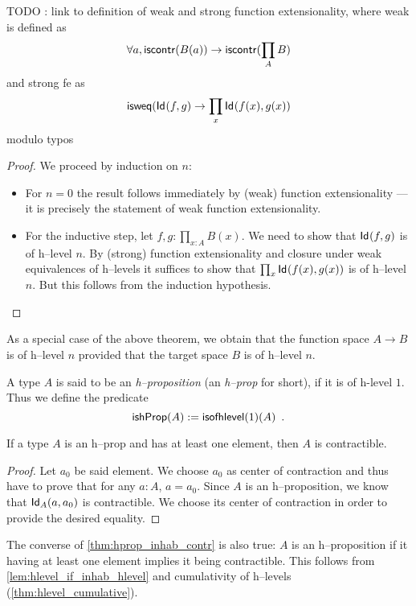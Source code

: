 TODO : link to definition of weak and strong function extensionality, where
weak is defined as
\[ \forall a, \iscontr (B(a)) \to \iscontr (\prod_A B) \]
and strong fe as
\[ \isweq (\idtype{f}{g} \to \prod_x \idtype{f(x)}{g(x)} \]
modulo typos

\begin{proof}
 We proceed by induction on $n$:
 \begin{itemize}
  \item For $n = 0$ the result follows immediately by (weak) function extensionality ---
        it is precisely the statement of weak function extensionality.
  \item For the inductive step, let $f, g : \prod_{x:A}B(x)$. We need to show that
      $\idtype{f}{g}$ is of h--level $n$. By (strong) function extensionality and closure
      under weak equivalences of h--levels it suffices to show that 
      $\prod_x \idtype{f(x)}{g(x)}$ is of h--level $n$. But this follows from the
      induction hypothesis.
 \end{itemize}

\end{proof}

\noindent
As a special case of the above theorem, we obtain that the function space $A \to B$ is of h--level $n$
provided that the target space $B$ is of h--level $n$. 

\begin{defn}
 A type $A$ is said to be an \emph{h--proposition} (an \emph{h--prop} for short), if it is of h-level $1$. 
  Thus we define the predicate
 \[\ishProp (A) := \isofhlevel(1)(A) \enspace .\]
\end{defn}

\begin{thm}\label{thm:hprop_inhab_contr}
 If a type $A$ is an h--prop and has at least one element, then $A$ is contractible.
\end{thm}

\begin{proof}
 Let $a_0$ be said element. We choose $a_0$ as center of contraction and thus have to
  prove that for any $a : A$, $a = a_0$.
  Since $A$ is an h--proposition, we know that $\idtype[A]{a}{a_0}$ is contractible.
  We choose its center of contraction in order to provide the desired equality.
\end{proof}

\begin{rmk}
 The converse of \autoref{thm:hprop_inhab_contr} is also true:
  $A$ is an h--proposition if it having at least one element implies it being contractible.
 This follows from \autoref{lem:hlevel_if_inhab_hlevel} and cumulativity of h--levels (\autoref{thm:hlevel_cumulative}).
\end{rmk}



